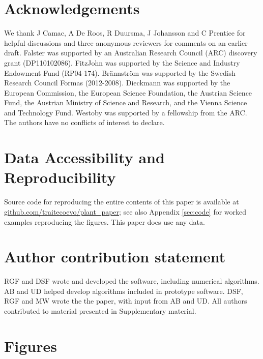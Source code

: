 \documentclass[a4paper,11pt]{article}
\begin{document}
\section{Acknowledgements}

We thank J Camac, A De Roos, R Duursma, J Johansson and C Prentice for helpful
discussions and three anonymous reviewers for comments on an earlier draft. Falster
was supported by an Australian Research Council (ARC) discovery grant (DP110102086).
FitzJohn was supported by the Science and Industry Endowment Fund (RP04-174).
Br{\"a}nnstr{\"o}m was supported by the Swedish Research Council Formas (2012-2008).
Dieckmann was supported by the European Commission, the European Science Foundation,
the Austrian Science Fund, the Austrian Ministry of Science and Research, and the
Vienna Science and Technology Fund. Westoby was supported by a fellowship from the ARC.
The authors have no conflicts of interest to declare.

\section{Data Accessibility and Reproducibility}

Source code for reproducing the entire contents of this paper is available at
\href{https://github.com/traitecoevo/plant\_paper}{github.com/traitecoevo/plant\_paper};
see also Appendix \ref{sec:code} for worked examples reproducing the figures.
This paper does use any data.

\section{Author contribution statement}

RGF and DSF wrote and developed the software, including numerical algorithms. AB and UD helped develop algorithms included in prototype software. DSF, RGF and MW wrote the the paper, with input from AB and UD. All authors contributed to material presented in Supplementary material.

\clearpage


\clearpage

\section{Figures}\label{figures}
\end{document}
